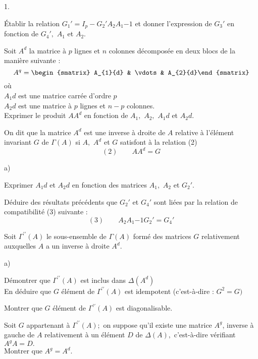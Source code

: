 \documentclass[11pt]{article}%
\begin{document}
\begin{noliste}{1.}
 \setlength{\itemsep}{4mm}
\item Établir la relation $G_{1}{\prime } = I_{p}-G_{2}{\prime
}A_{2}A_{1}{-1}$ et donner l'expression de $G_{3}{\prime }$ en fonction
de 
$G_{4}{\prime },$ $A_{1}$ et $A_{2}.$

\item Soit $A^{d}$ la matrice à $p$ lignes et $n$ colonnes décomposée
en
deux blocs de la manière suivante :
\[
A^{q} = 
\begin{smatrix}
A_{1}{d} & \vdots & A_{2}{d}\end{smatrix}
\]
où \\
$A_{1}{d}$ est une matrice carrée d'ordre $p$\\
$A_{2}{d}$ est une matrice à $p$ lignes et $n-p$ colonnes.\\
Exprimer le produit $AA^{d}$ en fonction de $A_{1},$ $A_{2},$
$A_{1}{d}$ et 
$A_{2}{d}.$

\item On dit que la matrice $A^{d}$ est une inverse à droite de $A$
relative 
à l'élément invariant $G$ de $\Gamma (A)$ si $A,$ $A^{d}$ et $G$
satisfont à
la relation (2)
\[
(2)\qquad AA^{d} = G
\]

\begin{noliste}{a)}
 \setlength{\itemsep}{2mm}
\item Exprimer $A_{1}{d}$ et $A_{2}{d}$ en fonction des matrices
$A_{1},$ $A_{2}$ et $G_{2}{\prime }.$

\item Déduire des résultats précédents que $G_{2}{\prime }$ et
$G_{4}{\prime }$ sont liées par la relation de compatibilité (3)
suivante :
\[
(3)\qquad A_{2}A_{1}{-1}G_{2}{\prime } = G_{4}{\prime }
\]
\end{noliste}

\item Soit $\Gamma ^{\prime \prime }(A)$ le sous-ensemble de $\Gamma
(A)$
formé des matrices $G$ relativement auxquelles $A$ a un inverse à
droite $A^{d}.$

\begin{noliste}{a)}
 \setlength{\itemsep}{2mm}
\item Démontrer que $\Gamma ^{\prime \prime }(A)$ est inclus dans
$\Delta
(A^{d})$\\
En déduire que $G$ élément de $\Gamma ^{\prime \prime }(A)$ est
idempotent
(c'est-à-dire : $G^{2} = G)$

\item Montrer que $G$ élément de $\Gamma ^{\prime \prime }(A)$ est
diagonalisable.
\end{noliste}

\item Soit $G$ appartenant à $\Gamma ^{\prime \prime }(A);$ on suppose
qu'il
existe une matrice $A^{g}$, inverse à gauche de $A$ relativement à un
élément $D$ de $\Delta (A),$ c'est-à-dire vérifiant $A^{g}A = D.$\\
Montrer que $A^{g} = A^{d}.$
\end{noliste}

\label{fin}
\end{document}
